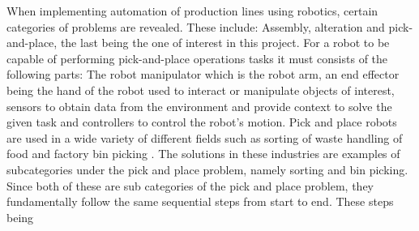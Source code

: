 When implementing automation of production lines using robotics, certain categories of problems are revealed. These include: Assembly, alteration and pick-and-place, the last being the one of interest in this project. 
For a robot to be capable of performing pick-and-place operations tasks it must consists of the following parts: The robot manipulator which is the robot arm, an end effector being the hand of the robot used to interact or manipulate objects of interest, sensors to obtain data from the environment and provide context to solve the given task and controllers to control the robot's motion.
Pick and place robots are used in a wide variety of different fields such as 
sorting of waste \cite*{robotic-pick-and-toss-facilitates-urban-waste-sorting}
handling of food \cite*{automation-of-mobile-pick-and-place-robotic-system-for-small-food-industry}\cite*{development-of-a-food-handling-soft-robot-hand-considering-a-high-speed-pick-and-place-task} and factory bin picking \cite*{real-time-industrial-bin-picking-with-a-hybrid-deep-learning-engineering-approach} \cite*{a-bin-picking-benchmark-for-systematic-evaluation-of-robotic-pick-and-place-systems} \cite{generic-development-of-bin-pick-and-place-system-based-on-robot-operating-system}. The solutions in these industries are examples of subcategories under the pick and place problem, namely sorting and bin picking. Since both of these are sub categories of the pick and place problem, they fundamentally follow the same sequential steps from start to end. 
These steps being 


